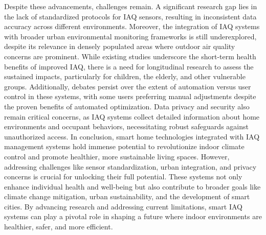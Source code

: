 \documentclass[USenglish,oneside,twocolumn]{article}
\begin{document}
Despite these advancements, challenges remain. A significant research gap lies in the lack of standardized protocols for IAQ sensors, resulting in inconsistent data accuracy across different environments. Moreover, the integration of IAQ systems with broader urban environmental monitoring frameworks is still underexplored, despite its relevance in densely populated areas where outdoor air quality concerns are prominent. While existing studies underscore the short-term health benefits of improved IAQ, there is a need for longitudinal research to assess the sustained impacts, particularly for children, the elderly, and other vulnerable groups. Additionally, debates persist over the extent of automation versus user control in these systems, with some users preferring manual adjustments despite the proven benefits of automated optimization. Data privacy and security also remain critical concerns, as IAQ systems collect detailed information about home environments and occupant behaviors, necessitating robust safeguards against unauthorized access.\cite{salthammer_2011_critical} In conclusion, smart home technologies integrated with IAQ management systems hold immense potential to revolutionize indoor climate control and promote healthier, more sustainable living spaces. However, addressing challenges like sensor standardization, urban integration, and privacy concerns is crucial for unlocking their full potential. These systems not only enhance individual health and well-being but also contribute to broader goals like climate change mitigation, urban sustainability, and the development of smart cities. By advancing research and addressing current limitations, smart IAQ systems can play a pivotal role in shaping a future where indoor environments are healthier, safer, and more efficient.
\end{document}
